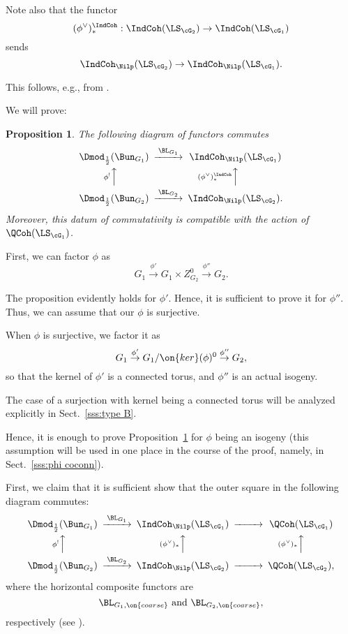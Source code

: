 \documentclass[9pt]{amsart}
\newtheorem{prop}[subsubsection]{Proposition}
\theoremstyle{remark}
\theoremstyle{definition}
\theoremstyle{remark}
\newcommand{\secref}[1]{Sect.~\ref{#1}}
\newcommand{\propref}[1]{Proposition~\ref{#1}}
\numberwithin{equation}{section}
\begin{document}
Note also that the functor
$$(\phi^\vee)^\IndCoh_*:\IndCoh(\LS_{\cG_2})\to \IndCoh(\LS_{\cG_1})$$
sends
$$\IndCoh_\Nilp(\LS_{\cG_2})\to \IndCoh_\Nilp(\LS_{\cG_1}).$$

\medskip

This follows, e.g., from \cite[Proposition 7.1.3(b)]{AG}. 

\sssec{}

We will prove:

\begin{prop} \label{p:alm isogeny} 
The following diagram of functors commutes
\begin{equation} \label{e:alm isogeny}
\CD
\Dmod_{\frac{1}{2}}(\Bun_{G_1}) @>{\BL_{G_1}}>> \IndCoh_\Nilp(\LS_{\cG_1}) \\
@A{\phi^!}AA  @A{(\phi^\vee)^\IndCoh_*}AA  \\
\Dmod_{\frac{1}{2}}(\Bun_{G_2}) @>{\BL_{G_2}}>> \IndCoh_\Nilp(\LS_{\cG_2}).
\endCD
\end{equation} 
Moreover, this datum of commutativity is compatible with the action of $\QCoh(\LS_{\cG_1})$. 
\end{prop} 

\ssec{Proof of \propref{p:alm isogeny}}

\sssec{}

First, we can factor $\phi$ as
$$G_1\overset{\phi'}\to G_1\times Z^0_{G_2}\overset{\phi''}\to G_2.$$

The proposition evidently holds for $\phi'$. Hence, it is sufficient to prove it for $\phi''$.
Thus, we can assume that our $\phi$ is surjective.

\sssec{}

When $\phi$ is surjective, we factor it as 
$$G_1\overset{\phi'}\to G_1/\on{ker}(\phi)^0\overset{\phi''}\to G_2,$$
so that the kernel of $\phi'$ is a connected torus, and $\phi''$ is an actual isogeny. 

\medskip

The case of a surjection with kernel being a connected torus will be analyzed explicitly in 
\secref{sss:type B}. 

\medskip

Hence, it is enough to prove \propref{p:alm isogeny} for $\phi$ being an isogeny
(this assumption will be used in one place in the course of the proof, namely, in \secref{sss:phi coconn}). 

\sssec{}

First, we claim that it is sufficient show that the outer square in the following diagram commutes:
\begin{equation} \label{e:alm isogeny'}
\CD
\Dmod_{\frac{1}{2}}(\Bun_{G_1}) @>{\BL_{G_1}}>> \IndCoh_\Nilp(\LS_{\cG_1}) @>>> \QCoh(\LS_{\cG_1}) \\
@A{\phi^!}AA  @A{(\phi^\vee)_*}AA  @A{(\phi^\vee)_*}AA \\
\Dmod_{\frac{1}{2}}(\Bun_{G_2}) @>{\BL_{G_2}}>> \IndCoh_\Nilp(\LS_{\cG_2}) @>>> \QCoh(\LS_{\cG_2}),
\endCD
\end{equation} 
where the horizontal composite functors are 
$$\BL_{G_1,\on{coarse}} \text{ and } \BL_{G_2,\on{coarse}},$$
respectively (see \cite[Sect. 1.4]{GLC1}). 
\end{document}
